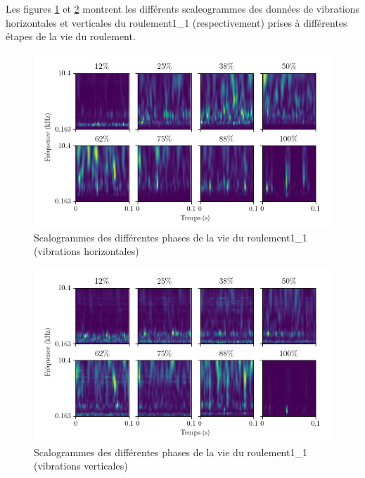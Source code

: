 Les figures \ref{fig:bearings_fault_progress_scaleograms_h} et \ref{fig:bearings_fault_progress_scaleograms_v} montrent les différents scaleogrammes des données de vibrations horizontales et verticales du roulement1\_1 (respectivement) prises à différentes étapes de la vie du roulement.


\begin{figure}[h]
	\centering
	\includegraphics[]{figures/femtocwt_scaleograms_h_fr.png}
	\caption{Scalogrammes des différentes phases de la vie du roulement1\_1 (vibrations horizontales)}%
	\label{fig:bearings_fault_progress_scaleograms_h}
\end{figure}

\begin{figure}[h]
	\centering
	\includegraphics[]{figures/femtocwt_scaleograms_v_fr.png}
	\caption{Scalogrammes des différentes phases de la vie du roulement1\_1 (vibrations verticales)}%
	\label{fig:bearings_fault_progress_scaleograms_v}
\end{figure}

